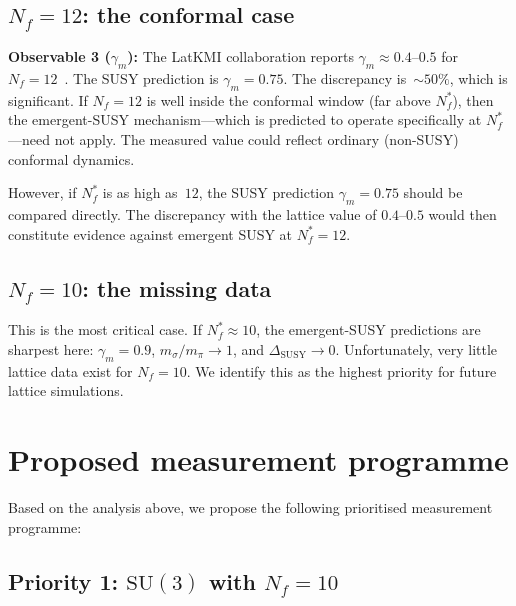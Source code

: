\documentclass[11pt,a4paper]{article}
\theoremstyle{plain}
\theoremstyle{definition}
\theoremstyle{remark}
\newcommand{\Nf}{N_{\!f}}
\newcommand{\Nfstar}{\Nf^*}
\newcommand{\SU}[1]{\mathrm{SU}(#1)}
\begin{document}
\subsection{$\Nf = 12$: the conformal case}

\textbf{Observable 3 ($\gamma_m$):}
The LatKMI collaboration reports $\gamma_m \approx 0.4$--$0.5$ for
$\Nf = 12$~\cite{LatKMI2016_Nf12}.  The SUSY prediction is
$\gamma_m = 0.75$.  The discrepancy is~$\sim 50\%$, which is
significant.  If $\Nf = 12$ is well inside the conformal window (far
above $\Nfstar$), then the emergent-SUSY mechanism---which is
predicted to operate specifically at $\Nfstar$---need not apply.  The
measured value could reflect ordinary (non-SUSY) conformal dynamics.

However, if $\Nfstar$ is as high as~$12$, the SUSY prediction
$\gamma_m = 0.75$ should be compared directly.  The discrepancy
with the lattice value of $0.4$--$0.5$ would then constitute evidence
against emergent SUSY at $\Nfstar = 12$.

\subsection{$\Nf = 10$: the missing data}

This is the most critical case.  If $\Nfstar \approx 10$, the
emergent-SUSY predictions are sharpest here: $\gamma_m = 0.9$,
$m_\sigma / m_\pi \to 1$, and $\Delta_{\mathrm{SUSY}} \to 0$.
Unfortunately, very little lattice data exist for $\Nf = 10$.  We
identify this as the highest priority for future lattice simulations.


\section{Proposed measurement programme}
\label{sec:programme}

Based on the analysis above, we propose the following prioritised
measurement programme:

\subsection{Priority 1: $\SU{3}$ with $\Nf = 10$}
\end{document}

